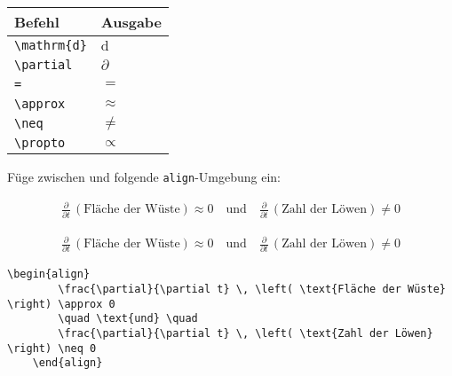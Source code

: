 \begin{frame}[fragile]
	\begin{center}
		\begin{tabular}{ll}
			\toprule
			Befehl							&	Ausgabe					\\ \midrule
			\lstinline|\mathrm{d}|		&	$\mathrm{d}$		\\
			\lstinline|\partial|		&	$\partial$		
			\\
			\lstinline|=|		&	$=$		
      \\
			\lstinline|\approx|		&	$\approx$		
			\\
			\lstinline|\neq|					&	$\neq$		\\
	        \lstinline|\propto|					&	$\propto$		\\
			\bottomrule
		\end{tabular}
	\end{center}
	\pause\btVFill
	\Aufgabee
		Füge zwischen  und  folgende \lstinline[basicstyle=\normalfont\normalsize]|align|-Umgebung ein:
	\begin{outputbox}
	    \begin{align}
		    \frac{\partial}{\partial t} \, \left( \text{Fläche der Wüste} \right) \approx 0
		    \quad \text{und} \quad
		      \frac{\partial}{\partial t} \, \left( \text{Zahl der Löwen} \right) \neq 0
		\end{align}	
    \end{outputbox}
	\vspace{0.3cm}
\end{frame}
\begin{frame}[fragile]
	\Losung
	\begin{outputbox}
	    \begin{align}
	        \frac{\partial}{\partial t} \, \left( \text{Fläche der Wüste} \right) \approx 0
	        \quad \text{und} \quad
	        \frac{\partial}{\partial t} \, \left( \text{Zahl der Löwen} \right) \neq 0
	    \end{align}
	\end{outputbox}

	\Code
	\begin{lstlisting}[gobble=4]
    \begin{align}
        \frac{\partial}{\partial t} \, \left( \text{Fläche der Wüste} \right) \approx 0
        \quad \text{und} \quad
        \frac{\partial}{\partial t} \, \left( \text{Zahl der Löwen} \right) \neq 0
    \end{align}
	\end{lstlisting}
\end{frame}

